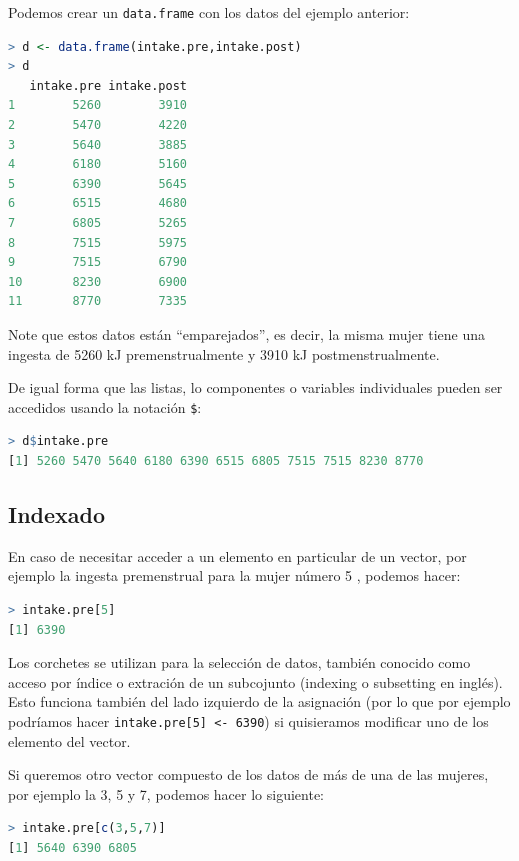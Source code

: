 Podemos crear un \texttt{data.frame} con los datos del ejemplo anterior:

\begin{lstlisting}[language=R]
> d <- data.frame(intake.pre,intake.post)
> d
   intake.pre intake.post
1        5260        3910
2        5470        4220
3        5640        3885
4        6180        5160
5        6390        5645
6        6515        4680
7        6805        5265
8        7515        5975
9        7515        6790
10       8230        6900
11       8770        7335
\end{lstlisting}

Note que estos datos están ``emparejados'', es decir, la misma mujer tiene una
ingesta de 5260 kJ premenstrualmente y 3910 kJ postmenstrualmente.

De igual forma que las listas, lo componentes o variables individuales pueden
ser accedidos usando la notación \texttt{\$}:

\begin{lstlisting}[language=R]
> d$intake.pre
[1] 5260 5470 5640 6180 6390 6515 6805 7515 7515 8230 8770
\end{lstlisting}

\subsection{Indexado} \label{index}

En caso de necesitar acceder a un elemento en particular de un vector, por
ejemplo la ingesta premenstrual para la mujer número 5 , podemos hacer:

\begin{lstlisting}[language=R]
> intake.pre[5]
[1] 6390
\end{lstlisting}

Los corchetes se utilizan para la selección de datos, también conocido como
acceso por índice o extración de un subcojunto (indexing o subsetting en
inglés). Esto funciona también del lado izquierdo de la asignación (por lo que
por ejemplo podríamos hacer \texttt{intake.pre[5] <- 6390}) si quisieramos
modificar uno de los elemento del vector.

Si queremos otro vector compuesto de los datos de más de una de las mujeres,
por ejemplo la 3, 5 y 7, podemos hacer lo siguiente:

\begin{lstlisting}[language=R]
> intake.pre[c(3,5,7)]
[1] 5640 6390 6805
\end{lstlisting}

